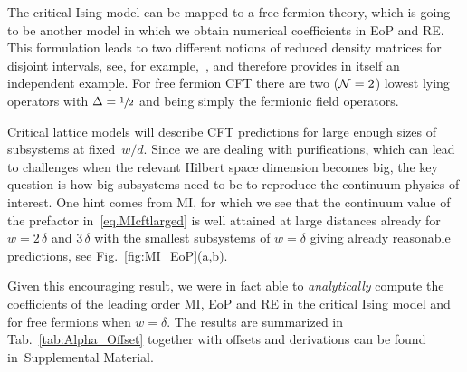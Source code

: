\documentclass[prl,a4paper,notitlepage,twocolumn,superscriptaddress,longbibliography,reprint]{revtex4-2}
\begin{document}
The critical Ising model can be mapped to a free fermion theory, which is going to be another model in which we obtain numerical coefficients in EoP and RE. This formulation leads to two different notions of reduced density matrices for disjoint intervals, see, for example,~\cite{Igloi_2010,Fagotti:2010yr,Coser:2015mta,coser2016spin,Camargo:2020yfv}, and therefore provides in itself an independent example. For free fermion CFT there are two (${\cal N} = 2$) lowest lying operators with $\Delta = \sfrac{1}{2}$ and being simply the fermionic field operators.

Critical lattice models will describe CFT predictions for large enough sizes of subsystems at fixed~$w/d$. Since we are dealing with purifications, which can lead to challenges when the relevant Hilbert space dimension becomes big, the key question is how big subsystems need to be to reproduce the continuum physics of interest. One hint comes from MI, for which we see that the continuum value of the prefactor in~\eqref{eq.MIcftlarged} is well attained at large distances already for $w = 2\, \delta$ and $3 \, \delta$ with the smallest subsystems of $w = \delta$ giving already reasonable predictions, see Fig.~\ref{fig:MI_EoP}(a,b). 

Given this encouraging result, we were in fact able to \emph{analytically} compute the coefficients of the leading order MI, EoP and RE in the critical Ising model and for free fermions when $w = \delta$. The results are summarized in Tab.~\ref{tab:Alpha_Offset} together with offsets and derivations can be found in~Supplemental Material.
\end{document}
